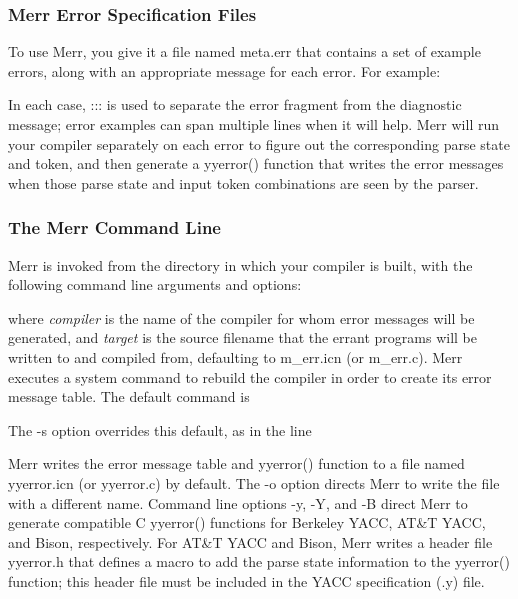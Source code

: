 \subsubsection{Merr Error Specification Files}
To use Merr, you give it a file named \textsf{meta.err} that contains a
set of example errors, along with an appropriate message for each
error. For example:


In each case, \textsf{:::} is used to separate the error fragment from
the diagnostic message; error examples can span multiple lines when it
will help. Merr will run your compiler separately on each error to
figure out the corresponding parse state and token, and then generate a
yyerror() function that writes the error messages when those parse
state and input token combinations are seen by the parser.

\subsubsection{The Merr Command Line}

Merr is invoked from the directory in which your compiler is built, with
the following command line arguments and options:


\noindent
where \textit{compiler} is the name of the compiler for whom error
messages will be generated, and \textit{target} is the source filename
that the errant programs will be written to and compiled from,
defaulting to \textsf{m\_err.icn} (or \textsf{m\_err.c}). Merr executes
a system command to rebuild the compiler in order to create its error
message table. The default command is


The \textsf{{}-s} option overrides this default, as in the line


Merr writes the error message table and \textsf{yyerror()} function to a
file named \textsf{yyerror.icn} (or \textsf{yyerror.c}) by default. The
\textsf{{}-o} option directs Merr to write the file with a different
name. Command line options \textsf{{}-y}, \textsf{{}-Y}, and
\textsf{{}-B} direct Merr to generate compatible C \textsf{yyerror()}
functions for Berkeley YACC, AT\&T YACC, and Bison, respectively. For
AT\&T YACC and Bison, Merr writes a header file \textsf{yyerror.h} that
defines a macro to add the parse state information to the yyerror()
function; this header file must be included in the YACC specification
(.y) file.

